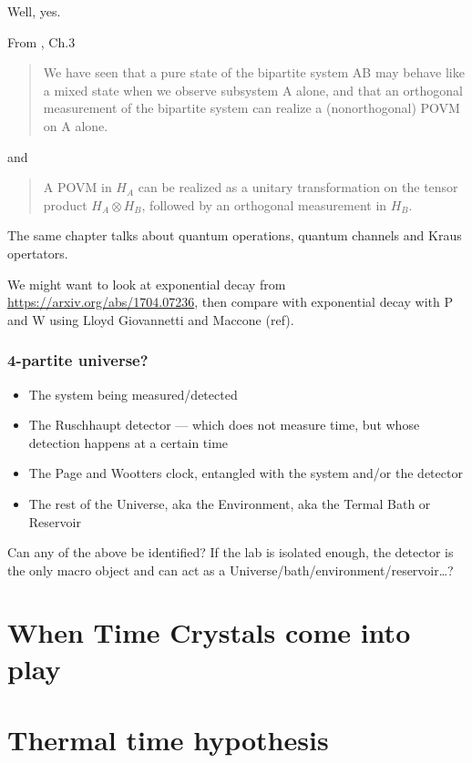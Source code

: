 \documentclass{book}
\begin{document}
Well, yes.

From \cite{PreskillNotes}, Ch.3 
\begin{quotation}
We have seen that
a pure state of the bipartite system AB may behave like a mixed state
when we observe subsystem A alone, and that an orthogonal measurement
of the bipartite system can realize a (nonorthogonal) POVM on A alone.
\end{quotation}

and

\begin{quotation}
A POVM in $H_A$ can be realized as a unitary transformation on the tensor
product $H_A \otimes H_B$, followed by an orthogonal measurement in $H_B$.
\end{quotation}

The same chapter talks about quantum operations, quantum channels and Kraus opertators.

We might want to look at exponential decay from \url{https://arxiv.org/abs/1704.07236},
then compare with exponential decay with P and W using Lloyd Giovannetti and Maccone (ref).

\subsection{4-partite universe?}
\begin{itemize}
  \item{The system being measured/detected}
  \item{The Ruschhaupt detector --- which does not measure time, but whose detection happens at a certain time}
  \item{The Page and Wootters clock, entangled with the system and/or the detector}
  \item{The rest of the Universe, aka the Environment, aka the Termal Bath or Reservoir}
\end{itemize}

Can any of the above be identified? If the lab is isolated enough,
the detector is the only macro object and can act as a Universe/bath/environment/reservoir\dots?

\chapter{When Time Crystals come into play}


\chapter{Thermal time hypothesis}

\end{document}

